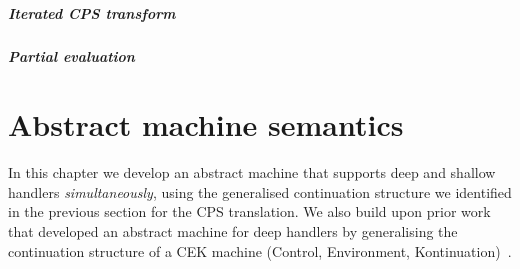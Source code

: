\documentclass[12pt,phd,lfcs,twoside,openright,logo,leftchapter,normalheadings]{infthesis}
\theoremstyle{plain}
\theoremstyle{definition}
\begin{document}







\paragraph{Iterated CPS transform}

\paragraph{Partial evaluation}

\chapter{Abstract machine semantics}

In this chapter we develop an abstract machine that supports deep and
shallow handlers \emph{simultaneously}, using the generalised
continuation structure we identified in the previous section for the
CPS translation. We also build upon prior work~\citep{HillerstromL16}
that developed an abstract machine for deep handlers by generalising
the continuation structure of a CEK machine (Control, Environment,
Kontinuation)~\citep{FelleisenF86}.
%
\end{document}
